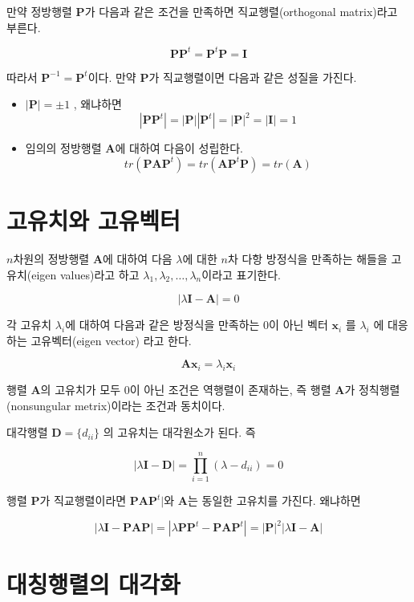 \documentclass[
]{book}
\theoremstyle{definition}
\theoremstyle{definition}
\theoremstyle{definition}
\theoremstyle{definition}
\theoremstyle{remark}
\begin{document}
만약 정방행렬 \(\bm P\)가 다음과 같은 조건을 만족하면 직교행렬(orthogonal matrix)라고 부른다.

\[  \bm P \bm P^t = \bm P^t \bm P = \bm I \]

따라서 \(\bm P^{-1} = \bm P^t\)이다. 만약 \(\bm P\)가 직교행렬이면 다음과 같은 성질을 가진다.

\begin{itemize}
\item
  \(| \bm P | = \pm 1\) , 왜냐하면
  \[  | \bm P \bm P^t | = | \bm P | |\bm P^t |  = | \bm P|^2 = |\bm I| =1 \]
\item
  임의의 정방행렬 \(\bm A\)에 대하여 다음이 성립한다.
  \[ tr(\bm P \bm A \bm P^t) = tr(\bm A \bm P^t \bm P) = tr(\bm A) \]
\end{itemize}

\hypertarget{uxace0uxc720uxce58uxc640-uxace0uxc720uxbca1uxd130}{%
\section{고유치와 고유벡터}\label{uxace0uxc720uxce58uxc640-uxace0uxc720uxbca1uxd130}}

\(n\)차원의 정방행렬 \(\bm A\)에 대하여 다음 \(\lambda\)에 대한 \(n\)차 다항 방정식을 만족하는 해들을 고유치(eigen values)라고 하고 \(\lambda_1, \lambda_2, \dots , \lambda_n\)이라고 표기한다.

\[ | \lambda \bm I - \bm A | = 0 \]

각 고유치 \(\lambda_i\)에 대하여 다음과 같은 방정식을 만족하는 0이 아닌 벡터 \(\bm x_i\) 를 \(\lambda_i\) 에 대응하는 고유벡터(eigen vector) 라고 한다.

\[ \bm A \bm x_i = \lambda_i \bm x_i \]

행렬 \(\bm A\)의 고유치가 모두 0이 아닌 조건은 역행렬이 존재하는, 즉 행렬 \(\bm A\)가 정칙행렬(nonsungular metrix)이라는 조건과 동치이다.

대각행렬 \(\bm D = \{ d_{ii} \}\) 의 고유치는 대각원소가 된다. 즉

\[ | \lambda \bm I - \bm D | = \prod_{i=1}^n (\lambda - d_{ii}) =0 \]

행렬 \(\bm P\)가 직교행렬이라면 \(\bm P \bm A \bm P^t|\)와 \(\bm A\)는 동일한 고유치를 가진다. 왜냐하면

\[ | \lambda \bm I - \bm P \bm A \bm P | = |\lambda \bm P \bm P^t - \bm P \bm A \bm P^t| = |\bm P|^2 | \lambda \bm I - \bm A | \]

\hypertarget{uxb300uxce6duxd589uxb82cuxc758-uxb300uxac01uxd654}{%
\section{대칭행렬의 대각화}\label{uxb300uxce6duxd589uxb82cuxc758-uxb300uxac01uxd654}}
\end{document}
